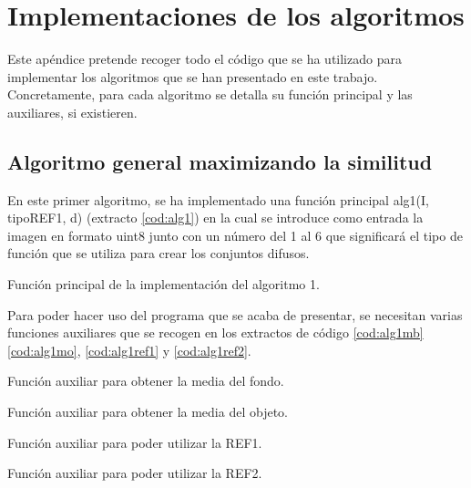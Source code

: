 \documentclass[main]{subfiles}
\begin{document}
\chapter{Implementaciones de los algoritmos}

Este apéndice pretende recoger todo el código que se ha utilizado para implementar los algoritmos que se han presentado en este trabajo. Concretamente, para cada algoritmo se detalla su función principal y las auxiliares, si existieren.


\section{Algoritmo general maximizando la similitud}
En este primer algoritmo, se ha implementado una función principal {\ttfamily alg1(I, tipoREF1, d)} (extracto \ref{cod:alg1}) en la cual se introduce como entrada la imagen en formato {\ttfamily uint8} junto con un número del 1 al 6 que significará el tipo de función que se utiliza para crear los conjuntos difusos.
\begin{listing}
    \caption{Función principal de la implementación del algoritmo 1.\label{cod:alg1}}
\end{listing}

Para poder hacer uso del programa que se acaba de presentar, se necesitan varias funciones auxiliares que se recogen en los extractos de código \ref{cod:alg1mb} \ref{cod:alg1mo}, \ref{cod:alg1ref1} y \ref{cod:alg1ref2}.
\newpage
\begin{listing}
    \caption{Función auxiliar para obtener la media del fondo.\label{cod:alg1mb}}
\end{listing}
\begin{listing}
    \caption{Función auxiliar para obtener la media del objeto.\label{cod:alg1mo}}
\end{listing}
\begin{listing}
    \caption{Función auxiliar para poder utilizar la REF1.\label{cod:alg1ref1}}
\end{listing}
\newpage
\begin{listing}
    \caption{Función auxiliar para poder utilizar la REF2.\label{cod:alg1ref2}}
\end{listing}
\end{document}
